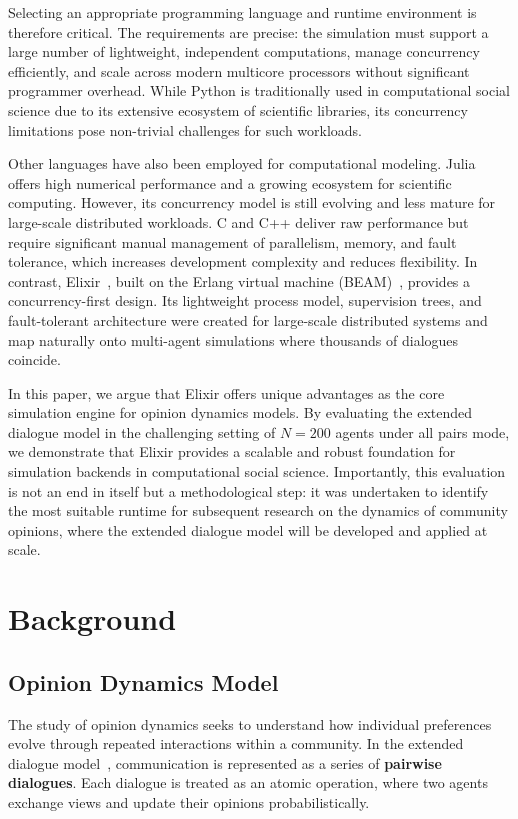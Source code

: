 \documentclass[
]{ceurart}
\begin{document}
Selecting an appropriate programming language and runtime environment is therefore critical. The requirements are precise: the simulation must support a large number of lightweight, independent computations, manage concurrency efficiently, and scale across modern multicore processors without significant programmer overhead. While Python is traditionally used in computational social science due to its extensive ecosystem of scientific libraries, its concurrency limitations pose non-trivial challenges for such workloads.

Other languages have also been employed for computational modeling. Julia~\cite{Julia2025} offers high numerical performance and a growing ecosystem for scientific computing. However, its concurrency model is still evolving and less mature for large-scale distributed workloads. C and C++ deliver raw performance but require significant manual management of parallelism, memory, and fault tolerance, which increases development complexity and reduces flexibility. In contrast, Elixir~\cite{Elixir2025}, built on the Erlang virtual machine (BEAM)~\cite{Erlang2025}, provides a concurrency-first design. Its lightweight process model, supervision trees, and fault-tolerant architecture were created for large-scale distributed systems and map naturally onto multi-agent simulations where thousands of dialogues coincide.

In this paper, we argue that Elixir offers unique advantages as the core simulation engine for opinion dynamics models. By evaluating the extended dialogue model in the challenging setting of $N = 200$ agents under all pairs mode, we demonstrate that Elixir provides a scalable and robust foundation for simulation backends in computational social science. Importantly, this evaluation is not an end in itself but a methodological step: it was undertaken to identify the most suitable runtime for subsequent research on the dynamics of community opinions, where the extended dialogue model will be developed and applied at scale.

\section{Background}\label{sec:background}
\subsection{Opinion Dynamics Model}
The study of opinion dynamics seeks to understand how individual preferences evolve through repeated interactions within a community. In the extended dialogue model~\cite{Lytvynenko2025}, communication is represented as a series of \textbf{pairwise dialogues}. Each dialogue is treated as an atomic operation, where two agents exchange views and update their opinions probabilistically.
\end{document}
